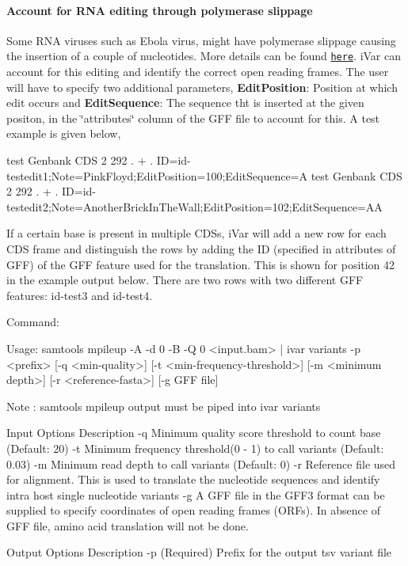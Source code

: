 \paragraph*{Account for R\+NA editing through polymerase slippage}

Some R\+NA viruses such as Ebola virus, might have polymerase slippage causing the insertion of a couple of nucleotides. More details can be found \href{https://viralzone.expasy.org/857?outline=all_by_protein}{\tt here}. i\+Var can account for this editing and identify the correct open reading frames. The user will have to specify two additional parameters, {\bfseries Edit\+Position}\+: Position at which edit occurs and {\bfseries Edit\+Sequence}\+: The sequence tht is inserted at the given positon, in the \char`\"{}attributes\char`\"{} column of the G\+FF file to account for this. A test example is given below,


\begin{DoxyCode}
test    Genbank CDS 2   292 .   +   .   ID=id-testedit1;Note=PinkFloyd;EditPosition=100;EditSequence=A
test    Genbank CDS 2   292 .   +   .  
       ID=id-testedit2;Note=AnotherBrickInTheWall;EditPosition=102;EditSequence=AA
\end{DoxyCode}


If a certain base is present in multiple C\+D\+Ss, i\+Var will add a new row for each C\+DS frame and distinguish the rows by adding the ID (specified in attributes of G\+FF) of the G\+FF feature used for the translation. This is shown for position 42 in the example output below. There are two rows with two different G\+FF features\+: id-\/test3 and id-\/test4.

Command\+: 
\begin{DoxyCode}
Usage: samtools mpileup -A -d 0 -B -Q 0 <input.bam> | ivar variants -p <prefix> [-q <min-quality>] [-t
       <min-frequency-threshold>] [-m <minimum depth>] [-r <reference-fasta>] [-g GFF file]

Note : samtools mpileup output must be piped into ivar variants

Input Options    Description
           -q    Minimum quality score threshold to count base (Default: 20)
           -t    Minimum frequency threshold(0 - 1) to call variants (Default: 0.03)
           -m    Minimum read depth to call variants (Default: 0)
           -r    Reference file used for alignment. This is used to translate the nucleotide sequences and
       identify intra host single nucleotide variants
           -g    A GFF file in the GFF3 format can be supplied to specify coordinates of open reading
       frames (ORFs). In absence of GFF file, amino acid translation will not be done.

Output Options   Description
           -p    (Required) Prefix for the output tsv variant file
\end{DoxyCode}


